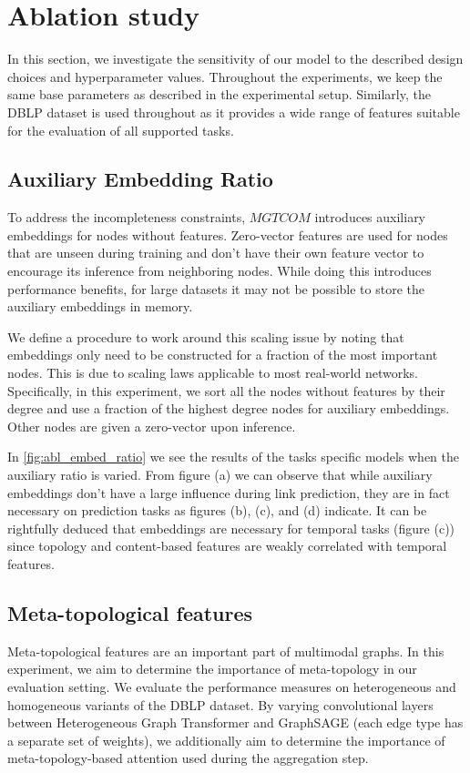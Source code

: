 \chapter{Ablation study} \label{sec:ablation}
In this section, we investigate the sensitivity of our model to the described design choices and hyperparameter values.
Throughout the experiments, we keep the same base parameters as described in the experimental setup.
Similarly, the DBLP dataset is used throughout as it provides a wide range of features suitable for the evaluation of all supported tasks.

\section{Auxiliary Embedding Ratio} \label{sec:abl:aux_emb}
To address the incompleteness constraints, $MGTCOM$ introduces auxiliary embeddings for nodes without features.
Zero-vector features are used for nodes that are unseen during training and don't have their own feature vector to encourage its inference from neighboring nodes.
While doing this introduces performance benefits, for large datasets it may not be possible to store the auxiliary embeddings in memory.

We define a procedure to work around this scaling issue by noting that embeddings only need to be constructed for a fraction of the most important nodes.
This is due to scaling laws applicable to most real-world networks.
Specifically, in this experiment, we sort all the nodes without features by their degree and use a fraction of the highest degree nodes for auxiliary embeddings. Other nodes are given a zero-vector upon inference.


In \cref{fig:abl_embed_ratio} we see the results of the tasks specific models when the auxiliary ratio is varied.
From figure (a) we can observe that while auxiliary embeddings don't have a large influence during link prediction, they are in fact necessary on prediction tasks as figures (b), (c), and (d) indicate.
It can be rightfully deduced that embeddings are necessary for temporal tasks (figure (c)) since topology and content-based features are weakly correlated with temporal features.

\section{Meta-topological features}
Meta-topological features are an important part of multimodal graphs.
In this experiment, we aim to determine the importance of meta-topology in our evaluation setting.
We evaluate the performance measures on heterogeneous and homogeneous variants of the DBLP dataset.
By varying convolutional layers between Heterogeneous Graph Transformer and GraphSAGE \cite{csirosdata61StargazersStellargraphStellargraph2018} (each edge type has a separate set of weights), we additionally aim to determine the importance of meta-topology-based attention used during the aggregation step.

